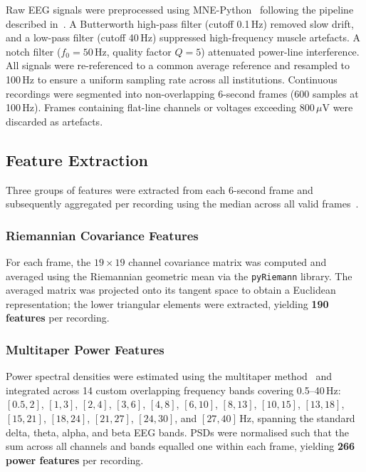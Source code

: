 \documentclass[preprint,12pt]{elsarticle}
\begin{document}
Raw EEG signals were preprocessed using
MNE-Python~\cite{gramfort2013mne} following the pipeline described
in~\cite{poziomska2026quantity}.
A Butterworth high-pass filter (cutoff 0.1\,Hz) removed slow drift,
and a low-pass filter (cutoff 40\,Hz) suppressed high-frequency
muscle artefacts.
A notch filter ($f_0 = 50$\,Hz, quality factor $Q = 5$) attenuated
power-line interference.
All signals were re-referenced to a common average reference and
resampled to 100\,Hz to ensure a uniform sampling rate across all
institutions.
Continuous recordings were segmented into non-overlapping 6-second
frames (600 samples at 100\,Hz).
Frames containing flat-line channels or voltages exceeding
$800\,\mu\text{V}$ were discarded as artefacts.

\subsection{Feature Extraction}
\label{subsec:features}

Three groups of features were extracted from each 6-second frame and
subsequently aggregated per recording using the median across all
valid frames~\cite{poziomska2026quantity}.

\subsubsection{Riemannian Covariance Features}

For each frame, the $19 \times 19$ channel covariance matrix was
computed and averaged using the Riemannian geometric mean via the
\texttt{pyRiemann} library.
The averaged matrix was projected onto its tangent space to obtain a
Euclidean representation; the lower triangular elements were
extracted, yielding \textbf{190 features} per recording.

\subsubsection{Multitaper Power Features}

Power spectral densities were estimated using the multitaper
method~\cite{thomson1982spectrum} and integrated across 14 custom
overlapping frequency bands covering 0.5--40\,Hz:
$[0.5, 2]$, $[1, 3]$, $[2, 4]$, $[3, 6]$, $[4, 8]$, $[6, 10]$,
$[8, 13]$, $[10, 15]$, $[13, 18]$, $[15, 21]$, $[18, 24]$,
$[21, 27]$, $[24, 30]$, and $[27, 40]$\,Hz, spanning the standard
delta, theta, alpha, and beta EEG bands.
PSDs were normalised such that the sum across all channels and bands
equalled one within each frame, yielding \textbf{266 power features}
per recording.
\end{document}

